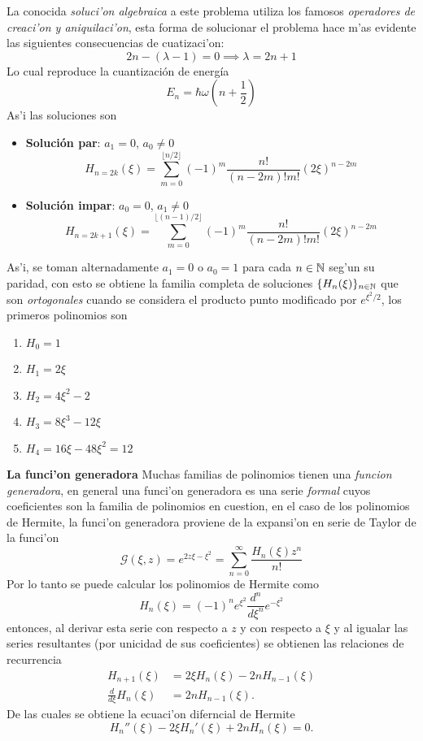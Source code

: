 \documentclass[main.tex]{subfiles}
\begin{document}
La conocida \emph{soluci'on algebraica} a este problema utiliza los famosos \emph{operadores de creaci'on y aniquilaci'on}, esta forma de solucionar el problema hace m'as evidente las siguientes consecuencias de cuatizaci'on:
\[
2n - (\lambda - 1) = 0 \implies \lambda = 2n + 1
\]
Lo cual reproduce la cuantización de energía
\[
E_n = \hbar\omega\left(n + \frac{1}{2}\right)
\]
As'i las soluciones son
\begin{itemize}
\item \textbf{Solución par}: \(a_1 = 0\), \(a_0 \neq 0\)
\[
H_{n=2k}(\xi) = \sum_{m=0}^{\lfloor n/2 \rfloor} (-1)^m \frac{n!}{(n-2m)!m!} (2\xi)^{n-2m}
\]

\item \textbf{Solución impar}: \(a_0 = 0\), \(a_1 \neq 0\)
\[
H_{n=2k+1}(\xi) = \sum_{m=0}^{\lfloor (n-1)/2 \rfloor} (-1)^m \frac{n!}{(n-2m)!m!} (2\xi)^{n-2m}
\]
\end{itemize}
As'i, se toman alternadamente $a_{1}=0$ o $a_{0}=1$ para cada $n\in \mathbb N $ seg'un su paridad, con esto se obtiene la familia completa de soluciones $\{H_{n}(\xi)\}_{n\in \mathbb N }$ que son \emph{ortogonales} cuando se considera el producto punto modificado por $e^{\xi^{2}/2}$, los primeros polinomios son
\begin{enumerate}
  \item $H_{0}=1$
  \item $H_{1}=2\xi$
  \item $H_{2}=4\xi^{2}-2$
  \item $H_{3}=8\xi^{3}-12\xi$
  \item $H_{4}=16\xi-48\xi^2=12$
\end{enumerate}
\noindent\textbf{La funci'on generadora}
Muchas familias de polinomios tienen una \emph{funcion generadora}, en general una funci'on generadora es una serie \emph{formal} cuyos coeficientes son la familia de polinomios en cuestion, en el caso de los polinomios de Hermite, la funci'on generadora proviene de la expansi'on en serie de Taylor de la funci'on
\[
  \mathcal{G}(\xi,z)=e^{2z\xi-\xi^{2}}=\sum_{n=0}^{\infty}\frac{H_{n}(\xi)z^{n}}{n!}
\]
Por lo tanto se puede calcular los polinomios de Hermite como
\begin{equation}
H_n(\xi) = (-1)^n e^{\xi^2}\frac{d^n}{d\xi^n}e^{-\xi^2}
\end{equation}
entonces, al derivar esta serie con respecto a $z$ y con respecto a $\xi$ y al igualar las series resultantes (por unicidad de sus coeficientes) se obtienen las relaciones de recurrencia
\begin{align}
H_{n+1}(\xi) &= 2\xi H_n(\xi) - 2n H_{n-1}(\xi) \\
\frac{d}{d\xi}H_n(\xi) &= 2n H_{n-1}(\xi).
\end{align}
De las cuales se obtiene la ecuaci'on diferncial de Hermite
\[
  H_{n}''(\xi) - 2\xi H_{n}'(\xi) + 2nH_{n}(\xi) = 0.
\]
\end{document}
